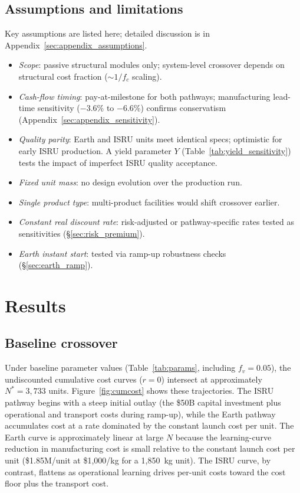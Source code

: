 \documentclass[5p,twocolumn]{elsarticle}
\begin{document}
\subsection{Assumptions and limitations}

Key assumptions are listed here; detailed discussion is in Appendix~\ref{sec:appendix_assumptions}.
\begin{itemize}
  \item \emph{Scope}: passive structural modules only; system-level crossover depends on structural cost fraction ($\sim$$1/f_c$ scaling).
  \item \emph{Cash-flow timing}: pay-at-milestone for both pathways; manufacturing lead-time sensitivity ($-$3.6\% to $-$6.6\%) confirms conservatism (Appendix~\ref{sec:appendix_sensitivity}).
  \item \emph{Quality parity}: Earth and ISRU units meet identical specs; optimistic for early ISRU production. A yield parameter $Y$ (Table~\ref{tab:yield_sensitivity}) tests the impact of imperfect ISRU quality acceptance.
  \item \emph{Fixed unit mass}: no design evolution over the production run.
  \item \emph{Single product type}: multi-product facilities would shift crossover earlier.
  \item \emph{Constant real discount rate}: risk-adjusted or pathway-specific rates tested as sensitivities (\S\ref{sec:risk_premium}).
  \item \emph{Earth instant start}: tested via ramp-up robustness checks (\S\ref{sec:earth_ramp}).
\end{itemize}

\section{Results}
\label{sec:results}

\subsection{Baseline crossover}

Under baseline parameter values (Table~\ref{tab:params}, including $f_v = 0.05$), the undiscounted cumulative cost curves ($r = 0$) intersect at approximately $N^* = 3{,}733$ units. Figure~\ref{fig:cumcost} shows these trajectories. The ISRU pathway begins with a steep initial outlay (the \$50B capital investment plus operational and transport costs during ramp-up), while the Earth pathway accumulates cost at a rate dominated by the constant launch cost per unit. The Earth curve is approximately linear at large $N$ because the learning-curve reduction in manufacturing cost is small relative to the constant launch cost per unit (\$1.85M/unit at \$1{,}000/kg for a 1{,}850~kg unit). The ISRU curve, by contrast, flattens as operational learning drives per-unit costs toward the cost floor plus the transport cost.
\end{document}

